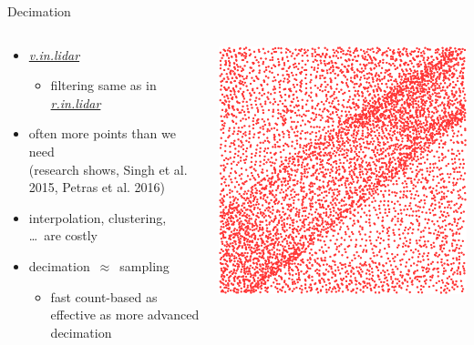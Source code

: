 \documentclass[xcolor={dvipsnames,usenames},beamer,aspectratio=169]{beamer}
\newcommand{\gmodule}[1]{\href{http://grass.osgeo.org/grass71/manuals/#1.html}{\emph{#1}}}
\begin{document}
\begin{frame}{Decimation}

\begin{columns}
\begin{column}{0.58\textwidth}

\begin{itemize}
  \item \gmodule{v.in.lidar}
  \begin{itemize}
  \item filtering same as in \gmodule{r.in.lidar}
  \end{itemize}
  \item often more points than we need {\small\\ (research shows, Singh et al. 2015, Petras et al. 2016)}
  \item interpolation, clustering, \ldots\ are costly
  \item decimation~$\approx$~sampling
  \begin{itemize}
    \item fast count-based as effective as more advanced decimation
  \end{itemize}
\end{itemize}

\end{column}
\begin{column}{0.22\textwidth}


\begin{center}
\includegraphics[width=\textwidth]{features/full}


\end{center}
\end{column}
\end{columns}
\end{frame}
\end{document}
